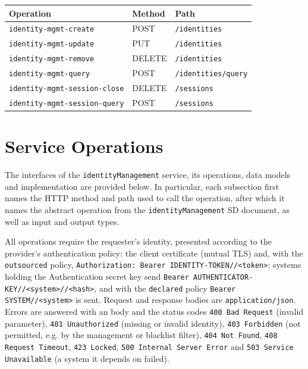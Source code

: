 \documentclass[a4paper]{arrowhead}
\newcommand{\mref}[2][]{{\textcolor{ArrowheadPurple}{\hyperref[sec:model:#2]{\ifstrempty{#1}{#2}{#1}}}}}
\begin{document}
\noindent\begin{longtable}{| p{5.2cm} | p{1.6cm} | p{8.4cm} |} \hline
\rowcolor{gray!33} Operation & Method & Path \\ \hline \endhead
\texttt{identity-\allowbreak{}mgmt-\allowbreak{}create} & POST & \texttt{/\allowbreak{}identities} \\ \hline
\texttt{identity-\allowbreak{}mgmt-\allowbreak{}update} & PUT & \texttt{/\allowbreak{}identities} \\ \hline
\texttt{identity-\allowbreak{}mgmt-\allowbreak{}remove} & DELETE & \texttt{/\allowbreak{}identities} \\ \hline
\texttt{identity-\allowbreak{}mgmt-\allowbreak{}query} & POST & \texttt{/\allowbreak{}identities/\allowbreak{}query} \\ \hline
\texttt{identity-\allowbreak{}mgmt-\allowbreak{}session-\allowbreak{}close} & DELETE & \texttt{/\allowbreak{}sessions} \\ \hline
\texttt{identity-\allowbreak{}mgmt-\allowbreak{}session-\allowbreak{}query} & POST & \texttt{/\allowbreak{}sessions} \\ \hline
\end{longtable}

\newpage

\section{Service Operations}
\label{sec:operations}

The interfaces of the \texttt{identityManagement} service, its operations, data models and implementation are provided below.
In particular, each subsection first names the HTTP method and path used to call the operation, after which it names the abstract operation from the \texttt{identityManagement} SD document, as well as input and output types.

All operations require the requester's identity, presented according to the provider's authentication policy: the client certificate (mutual TLS) and, with the \texttt{outsourced} policy, \texttt{Authorization: Bearer IDENTITY-TOKEN//<token>}; systems holding the Authentication secret key send \texttt{Bearer AUTHENTICATOR-KEY//<system>//<hash>}, and with the \texttt{declared} policy \texttt{Bearer SYSTEM//<system>} is sent. Request and response bodies are \texttt{application/json}.
Errors are answered with an \mref{ErrorMessage} body and the status codes \texttt{400 Bad Request} (invalid parameter), \texttt{401 Unauthorized} (missing or invalid identity), \texttt{403 Forbidden} (not permitted, e.g. by the management or blacklist filter), \texttt{404 Not Found}, \texttt{408 Request Timeout}, \texttt{423 Locked}, \texttt{500 Internal Server Error} and \texttt{503 Service Unavailable} (a system it depends on failed).
\end{document}

